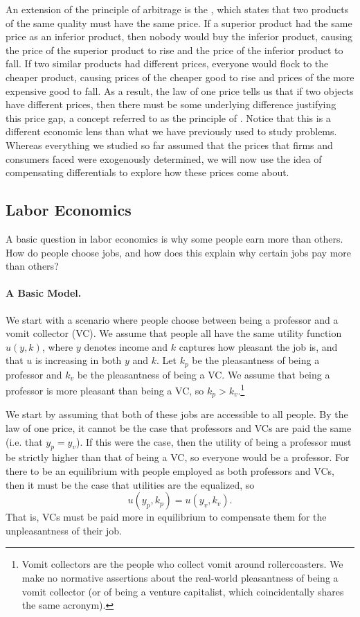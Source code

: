 An extension of the principle of arbitrage is the , which states that two products of the same quality must have the same price. If a superior product had the same price as an inferior product, then nobody would buy the inferior product, causing the price of the superior product to rise and the price of the inferior product to fall. If two similar products had different prices, everyone would flock to the cheaper product, causing prices of the cheaper good to rise and prices of the more expensive good to fall. As a result, the law of one price tells us that if two objects have different prices, then there must be some underlying difference justifying this price gap, a concept referred to as the principle of . Notice that this is a different economic lens than what we have previously used to study problems. Whereas everything we studied so far assumed that the prices that firms and consumers faced were exogenously determined, we will now use the idea of compensating differentials to explore how these prices come about.

\subsection*{Labor Economics}

A basic question in labor economics is why some people earn more than others. How do people choose jobs, and how does this explain why certain jobs pay more than others?

\paragraph{A Basic Model.} We start with a scenario where people choose between being a professor and a vomit collector (VC). We assume that people all have the same utility function $u(y, k)$, where $y$ denotes income and $k$ captures how pleasant the job is, and that $u$ is increasing in both $y$ and $k$. Let $k_p$ be the pleasantness of being a professor and $k_v$ be the pleasantness of being a VC. We assume that being a professor is more pleasant than being a VC, so $k_p > k_v.$\footnote{Vomit collectors are the people who collect vomit around rollercoasters. We make no normative assertions about the real-world pleasantness of being a vomit collector (or of being a venture capitalist, which coincidentally shares the same acronym).}

We start by assuming that both of these jobs are accessible to all people. By the law of one price, it cannot be the case that professors and VCs are paid the same (i.e. that $y_p = y_v$). If this were the case, then the utility of being a professor must be strictly higher than that of being a VC, so everyone would be a professor. For there to be an equilibrium with people employed as both professors and VCs, then it must be the case that utilities are the equalized, so 
$$u(y_p, k_p) = u(y_v, k_v).$$
That is, VCs must be paid more in equilibrium to compensate them for the unpleasantness of their job.

